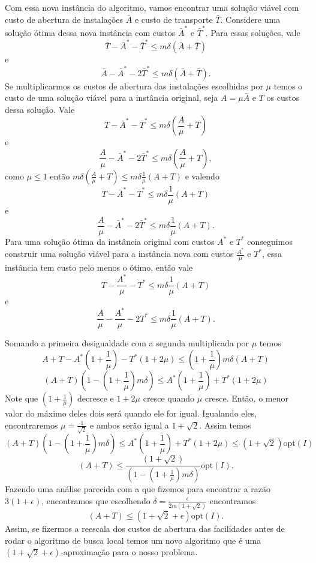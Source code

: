 \documentclass[12pt]{article}
\newcommand{\opt}{\ensuremath{\mathrm{opt}}}
\begin{document}
Com essa nova instância do algoritmo, vamos encontrar uma solução viável com custo de abertura de instalações $\bar{A}$ e custo de transporte $\bar{T}$. Considere uma solução ótima dessa nova instância com custos $\bar{A}^*$ e $\bar{T}^*$. Para essas soluções, vale
\[ \bar{T} - \bar{A}^* - \bar{T}^* \leq m\delta(\bar{A} + \bar{T})\]
e
\[ \bar{A} - \bar{A}^* - 2\bar{T}^* \leq m\delta(\bar{A} + \bar{T}).\]
Se multiplicarmos os custos de abertura das instalações escolhidas por $\mu$ temos o custo de uma solução viável para a instância original, seja $A = \mu\bar{A}$ e $T$ os custos dessa solução. Vale
\[ T - \bar{A}^* - \bar{T}^* \leq m\delta(\frac{A}{\mu}+ T)\]
e
\[ \frac{A}{\mu} - \bar{A}^* - 2\bar{T}^* \leq m\delta(\frac{A}{\mu} + T),\]
como $\mu \leq 1$ então $m\delta(\frac{A}{\mu}+ T) \leq m\delta\frac{1}{\mu}( A + T)$ e valendo 
\[T - \bar{A}^* - \bar{T}^* \leq m\delta\frac{1}{\mu}( A + T) \] 
e 
\[ \frac{A}{\mu} - \bar{A}^* - 2\bar{T}^* \leq m\delta\frac{1}{\mu}( A + T) .\]
Para uma solução ótima da instância original com custos $A^*$ e $T^*$ conseguimos construir uma solução viável para a instância nova com custos $\frac{A^*}{\mu}$ e $T^*$, essa instância tem custo pelo menos o ótimo, então vale
\[T - \frac{A^*}{\mu} - T^* \leq m\delta\frac{1}{\mu}( A + T) \] 
e 
\[ \frac{A}{\mu} - \frac{A^*}{\mu} - 2T^* \leq m\delta\frac{1}{\mu}( A + T) .\]

Somando a primeira desigualdade com a segunda multiplicada por $\mu$ temos
\[A + T - A^* (1 + \frac{1}{\mu}) - T^*(1 + 2\mu) \leq (1 + \frac{1}{\mu})m\delta(A+T)\]
\[(A+T)(1 - (1+\frac{1}{\mu})m\delta)\leq A^* (1 + \frac{1}{\mu}) + T^*(1 + 2\mu)\]
Note que $(1+\frac{1}{\mu})$ decresce e $1 + 2\mu$ cresce quando $\mu$ cresce. Então, o menor valor do máximo deles dois será quando ele for igual. Igualando eles, encontraremos $\mu = \frac{1}{\sqrt{2}}$ e ambos serão igual a $1 + \sqrt{2}$. Assim temos
\[(A+T)(1 - (1+\frac{1}{\mu})m\delta)\leq A^* (1 + \frac{1}{\mu}) + T^*(1 + 2\mu) \leq (1+\sqrt{2})\opt(I)\]
\[(A+T)\leq \frac{(1+\sqrt{2})}{(1 - (1+\frac{1}{\mu})m\delta)}\opt(I).\]
Fazendo uma análise parecida com a que fizemos para encontrar a razão $3(1 + \epsilon)$, encontramos que escolhendo $\delta = \frac{\epsilon}{2m(1+\sqrt{2})}$ encontramos 
\[(A+T) \leq (1 + \sqrt{2} + \epsilon )\opt(I).\]
Assim, se fizermos a reescala dos custos de abertura das facilidades antes de rodar o algoritmo de busca local temos um novo algoritmo que é uma $(1 + \sqrt{2} + \epsilon )$-aproximação para o nosso problema.
\newpage


\end{document}

